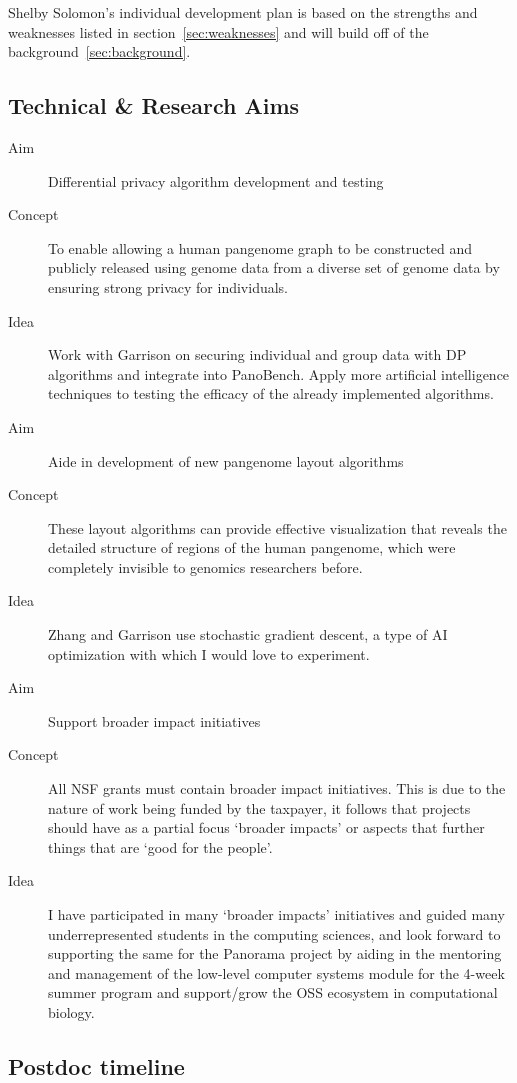 Shelby Solomon's individual development plan is based on the strengths and weaknesses listed in section~\ref{sec:weaknesses} and will build off of the background~\ref{sec:background}.

\subsection{Technical \& Research Aims}

\begin{description}
	\item[Aim] Differential privacy algorithm development and testing
	\item[Concept] To enable allowing a human pangenome graph to be constructed and publicly released using genome data from a diverse set of genome data by ensuring strong privacy for individuals.
	\item[Idea] Work with Garrison on securing individual and group data with DP algorithms and integrate into PanoBench. Apply more artificial intelligence techniques to testing the efficacy of the already implemented algorithms.
\end{description}

\begin{description}
	\item[Aim] Aide in development of new pangenome layout algorithms
	\item[Concept] These layout algorithms can provide effective visualization that reveals the detailed structure of regions of the human pangenome, which were completely invisible to genomics researchers before.
	\item[Idea] Zhang and Garrison use stochastic gradient descent, a type of AI optimization with which I would love to experiment.
\end{description}

\begin{description}
	\item[Aim] Support broader impact initiatives 
	\item[Concept] All NSF grants must contain broader impact initiatives. This is due to the nature of work being funded by the taxpayer, it follows that projects should have as a partial focus `broader impacts' or aspects that further things that are `good for the people'.
	\item[Idea] I have participated in many `broader impacts' initiatives and guided many underrepresented students in the computing sciences, and look forward to supporting the same for the Panorama project by aiding in the mentoring and management of the low-level computer systems module for the 4-week summer program and support/grow the OSS ecosystem in computational biology.
\end{description}


\subsection{Postdoc timeline}
